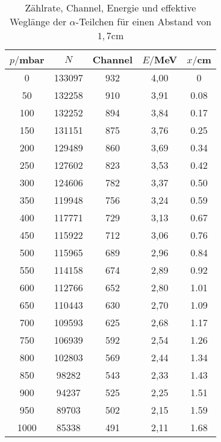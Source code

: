 \begin{table}[H]
  \centering
  \caption{Zählrate, Channel, Energie und effektive Weglänge der $\alpha$-Teilchen für einen Abstand von $1,7$cm}
  \label{tab:Spannungsamplitude}
  \begin{tabular}{c c c c c}
    \toprule
    $p/$mbar & $N$ & Channel & $E/$MeV & $x/$cm   \\%
    \midrule
    0	  & 133097  & 932 &   4,00 & 0       \\ %
    50	& 132258  & 910 &   3,91 & 0.08     \\%
    100 & 132252  & 894 &   3,84 & 0.17    \\ %
    150 & 131151  & 875 &   3,76 & 0.25    \\ %
    200 & 129489  & 860 &   3,69 & 0.34    \\ %
    250 & 127602  & 823 &   3,53 & 0.42    \\ %
    300 & 124606  & 782 &   3,37 & 0.50    \\ %
    350 & 119948  & 756 &   3,24 & 0.59    \\ %
    400 & 117771  & 729 &   3,13 & 0.67    \\ %
    450 & 115922  & 712 &   3,06 & 0.76    \\ %
    500 & 115965  & 689 &   2,96 & 0.84    \\ %
    550 & 114158  & 674 &   2,89 & 0.92    \\ %
    600 & 112766  & 652 &   2,80 & 1.01    \\ %
    650 & 110443  & 630 &   2,70 & 1.09    \\ %
    700 & 109593  & 625 &   2,68 & 1.17    \\ %
    750 & 106939  & 592 &   2,54 & 1.26    \\ %
    800 & 102803  & 569 &   2,44 & 1.34    \\ %
    850 & 98282	  & 543 &   2,33 & 1.43    \\ %
    900 & 94237	  & 525 &   2,25 & 1.51    \\ %
    950 & 89703	  & 502 &   2,15 & 1.59    \\ %
    1000& 85338   & 491 &   2,11 & 1.68    \\ %
    \bottomrule
  \end{tabular}
\end{table}





